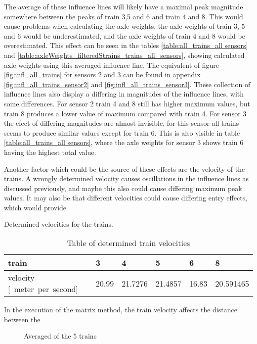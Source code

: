 The average of these influence lines will likely have a maximal peak magnitude somewhere between the peaks of train 3,5 and 6 and train 4 and 8. This would cause problems when calculating the axle weights, the axle weights of train 3, 5 and 6 would be underestimated, and the axle weights of train 4 and 8 would be overestimated. This effect can be seen in the tables \ref{table:all_trains_all sensors} and \ref{table:axleWeights_filteredStrains_trains_all_sensors}, showing calculated axle weights using this averaged influence line. The equivalent of figure \ref{fig:infl_all_trains} for sensors 2 and 3 can be found in appendix \ref{fig:infl_all_trains_sensor2} and \ref{fig:infl_all_trains_sensor3}. These collection of influence lines also display a differing in magnitudes of the influence lines, with some differences. For sensor 2 train 4 and 8 still has higher maximum values, but train 8 produces a lower value of maximum compared with train 4. For sensor 3 the efect of differing magnitudes are almost invisible, for this sensor all trains seems to produce similar values except for train 6. This is also visible in table \ref{table:all_trains_all sensors}, where the axle weights for sensor 3 shows train 6 having the highest total value.

Another factor which could be the source of these effects are the velocity of the trains. A wrongly determined velocity causes oscillations in the influence lines as discussed previously, and maybe this also could cause differing maximum peak values.
It may also be that different velocities could cause differing entry effects, which would provide

Determined velocities for the trains.
\begin{table}[h]
	\centering
	\begin{tabularx}{\textwidth}{ |X|X|X|X|X|X| }
		\hline
		train & 3 & 4 & 5 & 6 & 8 \\
		\hline
		velocity [\SI{}{meter per second}] & 20.99 & 21.7276	&21.4857 & 16.83 &	20.591465  \\
		\hline
	\end{tabularx}
	\caption{Table of determined train velocities}
	\label{table:speeds}
\end{table}

In the execution of the matrix method, the train velocity affects the distance between the
\begin{figure}[H]
	\begin{adjustbox}{center}
		
	\end{adjustbox}
	\caption{Averaged of the 5 trains}
	\label{fig:infl_vec_averaged_wBridge}
\end{figure}


